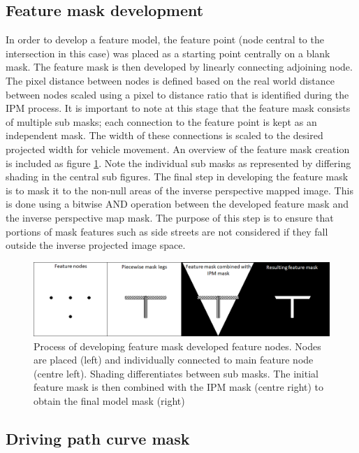 \documentclass[]{aiaa-tc}%
\begin{document}
\subsection{Feature mask development} \label{s:maskDevelopment}

In order to develop a feature model, the feature point (node central to the intersection in this case) was placed as a starting point centrally on a blank mask. The feature mask is then developed by linearly connecting adjoining node. The pixel distance between nodes is defined based on the real world distance between nodes scaled using a pixel to distance ratio that is identified during the IPM process. It is important to note at this stage that the feature mask consists of multiple sub masks; each connection to the feature point is kept as an independent mask. The width of these connections is scaled to the desired projected width for vehicle movement. An overview of the feature mask creation is included as figure \ref{f:featureMaskDevelopment}. Note the individual sub masks as represented by differing shading in the central sub figures. The final step in developing the feature mask is to mask it to the non-null areas of the inverse perspective mapped image. This is done using a bitwise AND operation between the developed feature mask and the inverse perspective map mask. The purpose of this step is to ensure that portions of mask features such as side streets are not considered if they fall outside the inverse projected image space. 

\begin{figure}
	\centering
	\includegraphics[width=1\textwidth]{FeatureMatching/featureMaskDevelopment.png}
	\caption{Process of developing feature mask developed feature nodes. Nodes are placed (left) and individually connected to main feature node (centre left). Shading differentiates between sub masks. The initial feature mask is then combined with the IPM mask (centre right) to obtain the final model mask (right)}
	\label{f:featureMaskDevelopment}
\end{figure}


\subsection{Driving path curve mask} \label{s:drivingPathMatching}
\end{document}
